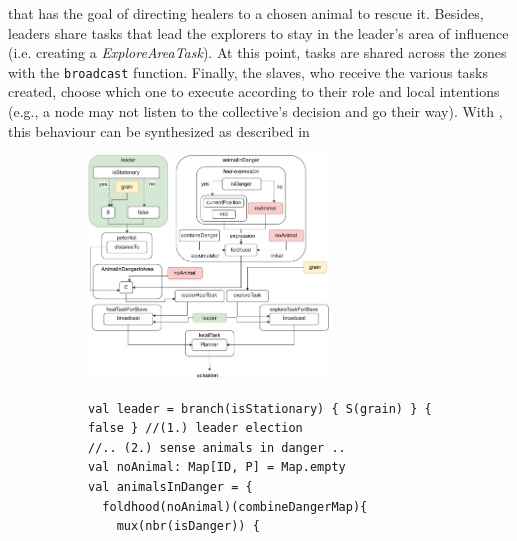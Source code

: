  that has the goal of directing healers to a chosen animal to 
 rescue it. Besides, leaders share tasks that lead the explorers 
 to stay in the leader's area of influence (i.e. creating a \emph{ExploreAreaTask}).
%
At this point, tasks are shared across 
 the zones with the \lstinline|broadcast| function.
%
Finally, the slaves, who receive the various tasks created,
 choose which one to execute according to their role and 
 local intentions (e.g., a node may not listen to 
 the collective's decision and go their way).
%
With \scafi{}, this behaviour can be synthesized as described in 
%
\begin{figure}
\centering
\begin{subfigure}[b]{\textwidth}
\centering
\includegraphics[width=0.7\textwidth]{papers/mdpi2020/imgs/wildlife-program-diagram.pdf}
\caption[High-level diagram expressing the implemented scenario]{\label{mdpi2020:fig:eval:diagram}}
\end{subfigure}
\par\bigskip %
\begin{subfigure}[b]{\textwidth}
\centering
\begin{lstlisting}[basicstyle=\lst@ifdisplaystyle\footnotesize\fi\ttfamily]
val leader = branch(isStationary) { S(grain) } { false } //(1.) leader election
//.. (2.) sense animals in danger ..
val noAnimal: Map[ID, P] = Map.empty
val animalsInDanger = {
  foldhood(noAnimal)(combineDangerMap){
    mux(nbr(isDanger)) {

\end{lstlisting}
\end{subfigure}
\end{figure}
